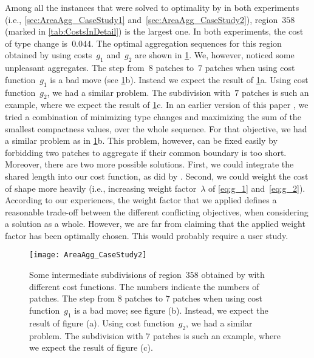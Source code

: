 \documentclass[acmsmall,natbib=false]{acmart}
\begin{document}
Among all the instances that were solved to optimality by \Astar
in both experiments (i.e., \sects\ref{sec:AreaAgg_CaseStudy1} 
and~\ref{sec:AreaAgg_CaseStudy2}),
region~$358$ (marked in \tab\ref{tab:CostsInDetail})
is the largest one.
In both experiments, the cost of type change is~$0.044$.
The optimal aggregation sequences for this region
obtained by using costs~$g_1$ and~$g_2$
are shown in \fig\ref{fig:AreaAgg_CaseStudy2_Rg358}.
We, however, noticed some unpleasant aggregates.
The step from~$8$ patches to~$7$ patches 
when using cost function~$g_1$ is a bad move
(see \fig\ref{fig:AreaAgg_CaseStudy2_Rg358}b).
Instead we expect the result of 
\fig\ref{fig:AreaAgg_CaseStudy2_Rg358}a.
Using cost function~$g_2$, we had a similar problem. 
The subdivision with~$7$ patches is such an example,
where we expect the result of 
\fig\ref{fig:AreaAgg_CaseStudy2_Rg358}c.
In an earlier version of this paper \parencite[see][]{Peng2017AStar},
we tried a combination of minimizing type changes 
and maximizing the sum of the smallest compactness values, 
over the whole sequence.
For that objective, we had a similar problem as 
in \fig\ref{fig:AreaAgg_CaseStudy2_Rg358}b.
This problem, however, can be fixed easily 
by forbidding two patches to aggregate 
if their common boundary is too short.
Moreover, there are two more possible solutions.
First, we could integrate the shared length
into our cost function, as did by \textcite{vanOosterom2005}.
Second, we could weight the cost of shape more heavily
(i.e., increasing weight factor~$\lambda$ of \eqs\ref{eq:g_1} and~\ref{eq:g_2}).
According to our experiences, 
the weight factor that we applied defines a reasonable trade-off 
between the different conflicting objectives, 
when considering a solution as a whole. 
However, we are far from claiming that 
the applied weight factor has been optimally chosen. 
This would probably require a user study.


\begin{figure}[h!tb]
\centering
\texttt{[image: AreaAgg\_CaseStudy2]}
\caption{Some intermediate subdivisions of region~$358$ 
	obtained by \Astar with different cost functions.
	The numbers indicate the numbers of patches.
    The step from $8$ patches to $7$ patches 
    when using cost function~$g_1$ is a bad move; see figure (b). 
    Instead, we expect the result of figure (a). 
    Using cost function~$g_2$, we had a similar problem. 
    The subdivision with $7$ patches is such an example, 
    where we expect the result of figure (c).
}
\label{fig:AreaAgg_CaseStudy2_Rg358}
\end{figure}
\end{document}
